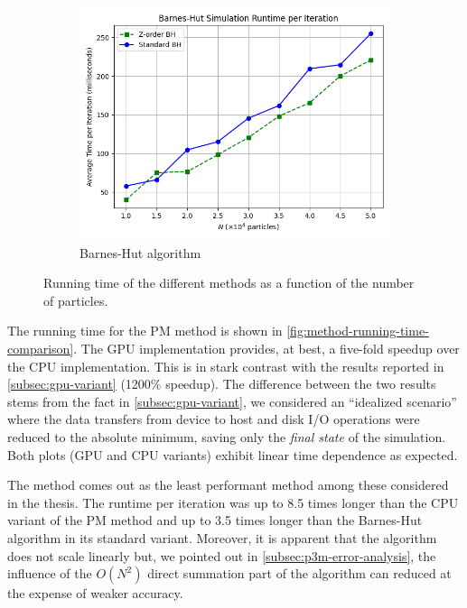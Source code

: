 \begin{figure}[!ht]
    \vspace{1em}

    \begin{subfigure}[b]{0.48\textwidth}
        \centering
        \includegraphics[width=\linewidth]{chapters/results/img/perf/bh_time.png}
        \caption{Barnes-Hut algorithm}
        \label{fig:bh-running-time}
    \end{subfigure}

    \caption{Running time of the different methods as a function of the number of particles.}
    \label{fig:method-running-time-comparison}
\end{figure}

The running time for the PM method is shown in \autoref{fig:method-running-time-comparison}.
The GPU implementation provides, at best, a five-fold speedup over the CPU implementation.
This is in stark contrast with the results reported in \autoref{subsec:gpu-variant} (1200\% speedup).
The difference between the two results stems from the fact in \autoref{subsec:gpu-variant}, we considered an ``idealized scenario'' where the data transfers from device to host and disk I/O operations were reduced to the absolute minimum, saving only the \textit{final state} of the simulation.
Both plots (GPU and CPU variants) exhibit linear time dependence as expected.

The \PThreeM{} method comes out as the least performant method among these considered in the thesis.
The runtime per iteration was up to 8.5 times longer than the CPU variant of the PM method and up to 3.5 times longer than the Barnes-Hut algorithm in its standard variant.
Moreover, it is apparent that the algorithm does not scale linearly but, we pointed out in \autoref{subsec:p3m-error-analysis}, the influence of the $O(N^2)$ direct summation part of the algorithm can reduced at the expense of weaker accuracy.

